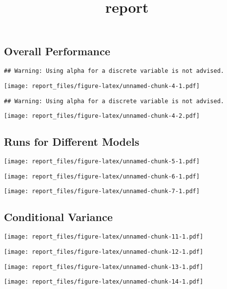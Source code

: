 \documentclass[]{article}
\title{report}
\author{}
\date{}
\begin{document}
\maketitle

\hypertarget{overall-performance}{%
\subsection{Overall Performance}\label{overall-performance}}

\begin{verbatim}
## Warning: Using alpha for a discrete variable is not advised.
\end{verbatim}

\texttt{[image: report\_files/figure-latex/unnamed-chunk-4-1.pdf]}

\begin{verbatim}
## Warning: Using alpha for a discrete variable is not advised.
\end{verbatim}

\texttt{[image: report\_files/figure-latex/unnamed-chunk-4-2.pdf]}

\hypertarget{runs-for-different-models}{%
\subsection{Runs for Different Models}\label{runs-for-different-models}}

\texttt{[image: report\_files/figure-latex/unnamed-chunk-5-1.pdf]}

\texttt{[image: report\_files/figure-latex/unnamed-chunk-6-1.pdf]}

\texttt{[image: report\_files/figure-latex/unnamed-chunk-7-1.pdf]}

\hypertarget{conditional-variance}{%
\subsection{Conditional Variance}\label{conditional-variance}}

\texttt{[image: report\_files/figure-latex/unnamed-chunk-11-1.pdf]}

\texttt{[image: report\_files/figure-latex/unnamed-chunk-12-1.pdf]}

\texttt{[image: report\_files/figure-latex/unnamed-chunk-13-1.pdf]}

\texttt{[image: report\_files/figure-latex/unnamed-chunk-14-1.pdf]}
\end{document}
